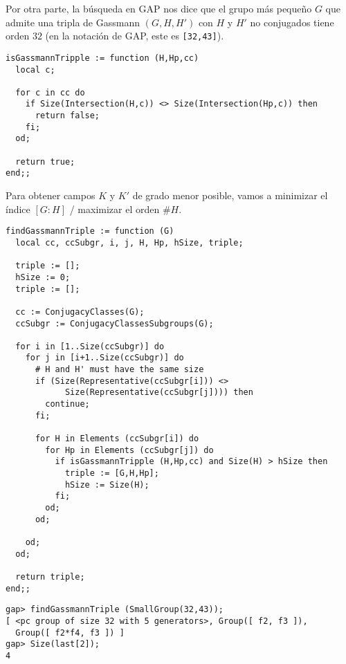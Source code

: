 \begin{ejemplo}
  Por otra parte, la búsqueda en GAP nos dice que el grupo más pequeño $G$ que
  admite una tripla de Gassmann $(G,H,H')$ con $H$ y $H'$ no conjugados tiene
  orden $32$ (en la notación de GAP, este es \texttt{[32,43]}).

  \begin{shaded}\small
\begin{verbatim}
isGassmannTripple := function (H,Hp,cc)
  local c;

  for c in cc do
    if Size(Intersection(H,c)) <> Size(Intersection(Hp,c)) then
      return false;
    fi;
  od;

  return true;
end;;
\end{verbatim}
  \end{shaded}

  Para obtener campos $K$ y $K'$ de grado menor posible,
  vamos a minimizar el índice $[G:H]$ / maximizar el orden $\# H$.

  \begin{shaded}
\begin{verbatim}
findGassmannTriple := function (G)
  local cc, ccSubgr, i, j, H, Hp, hSize, triple;

  triple := [];
  hSize := 0;
  triple := [];

  cc := ConjugacyClasses(G);
  ccSubgr := ConjugacyClassesSubgroups(G);

  for i in [1..Size(ccSubgr)] do
    for j in [i+1..Size(ccSubgr)] do
      # H and H' must have the same size
      if (Size(Representative(ccSubgr[i])) <>
            Size(Representative(ccSubgr[j]))) then
        continue;
      fi;

      for H in Elements (ccSubgr[i]) do
        for Hp in Elements (ccSubgr[j]) do
          if isGassmannTripple (H,Hp,cc) and Size(H) > hSize then
            triple := [G,H,Hp];
            hSize := Size(H);
          fi;
        od;
      od;

    od;
  od;

  return triple;
end;;
\end{verbatim}
  \end{shaded}

  \begin{shaded}
\begin{verbatim}
gap> findGassmannTriple (SmallGroup(32,43));
[ <pc group of size 32 with 5 generators>, Group([ f2, f3 ]), 
  Group([ f2*f4, f3 ]) ]
gap> Size(last[2]);
4
\end{verbatim}
  \end{shaded}


\end{ejemplo}
